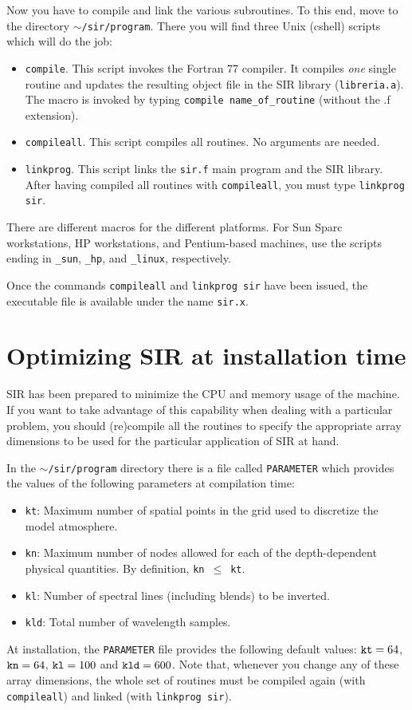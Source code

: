 \documentclass[11pt]{report}
\begin{document}
Now you have to compile and link the various subroutines. To this end,
move to the directory {\tt $\sim$/sir/program}. There you will find
three Unix (cshell) scripts which will do the job:
\begin{itemize}
\item {\tt compile}. This script invokes the Fortran 77 compiler. It
compiles {\em one} single routine and updates the resulting object file in 
the SIR library ({\tt libreria.a}). The macro is invoked by typing
{\tt compile name\_of\_routine} (without the .f extension).
\item {\tt compileall}. This script compiles all routines. No arguments
are needed.
\item {\tt linkprog}. This script links the {\tt sir.f} main program and
the SIR library. After having compiled all routines with 
{\tt compileall}, you must type {\tt linkprog sir}. 
\end{itemize}
There are different macros for the different platforms. For Sun Sparc 
workstations, HP workstations, and Pentium-based machines, use the
scripts ending in {\tt \_sun}, {\tt \_hp}, and {\tt \_linux}, respectively.

Once the commands {\tt compileall} and {\tt linkprog sir} have been
issued, the executable file is available under the name {\tt sir.x}. 

\section{Optimizing SIR at installation time} 
SIR has been prepared to minimize the CPU and memory usage of the
machine. If you want to take advantage of this capability when dealing 
with a particular problem, you should (re)compile all the routines 
to specify the appropriate array dimensions to be used for the particular 
application of SIR at hand.   

In the {\tt $\sim$/sir/program} directory there is a file called 
{\tt PARAMETER} which provides the values of the following 
parameters at compilation time:
\begin{itemize}
\item {\tt kt}: Maximum number of spatial points in the grid used to discretize
the model atmosphere. 
\item {\tt kn}: Maximum number of nodes allowed for each of the depth-dependent
physical quantities. By definition, {\tt kn}~$\leq$~{\tt kt}. 
\item {\tt kl}: Number of spectral lines (including blends) to be inverted.
\item {\tt kld}: Total number of wavelength samples.
\end{itemize}
At installation, the {\tt PARAMETER} file provides the following
default values:  ${\tt kt} =64$, ${\tt kn} = 64$, ${\tt kl}=100$ and
${\tt kld} = 600$. Note that, whenever you change any of these
array dimensions, the whole set of routines must be compiled again 
(with {\tt compileall}) and linked (with {\tt linkprog sir}).
\end{document}
